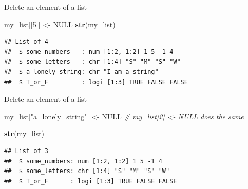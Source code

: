 \documentclass[ignorenonframetext,]{beamer}
\newenvironment{Shaded}{\begin{snugshade}}{\end{snugshade}}
\newcommand{\CommentTok}[1]{\textcolor[rgb]{0.56,0.35,0.01}{\textit{#1}}}
\newcommand{\DecValTok}[1]{\textcolor[rgb]{0.00,0.00,0.81}{#1}}
\newcommand{\KeywordTok}[1]{\textcolor[rgb]{0.13,0.29,0.53}{\textbf{#1}}}
\newcommand{\NormalTok}[1]{#1}
\newcommand{\OtherTok}[1]{\textcolor[rgb]{0.56,0.35,0.01}{#1}}
\newcommand{\StringTok}[1]{\textcolor[rgb]{0.31,0.60,0.02}{#1}}
\begin{document}
\begin{frame}[fragile]{Delete an element of a list}
\protect\hypertarget{delete-an-element-of-a-list-1}{}

\begin{Shaded}
\begin{Highlighting}[]
\NormalTok{my_list[[}\DecValTok{5}\NormalTok{]] <-}\StringTok{ }\OtherTok{NULL}
\KeywordTok{str}\NormalTok{(my_list)}
\end{Highlighting}
\end{Shaded}

\begin{verbatim}
## List of 4
##  $ some_numbers   : num [1:2, 1:2] 1 5 -1 4
##  $ some_letters   : chr [1:4] "S" "M" "S" "W"
##  $ a_lonely_string: chr "I-am-a-string"
##  $ T_or_F         : logi [1:3] TRUE FALSE FALSE
\end{verbatim}

\end{frame}

\begin{frame}[fragile]{Delete an element of a list}
\protect\hypertarget{delete-an-element-of-a-list-2}{}

\begin{Shaded}
\begin{Highlighting}[]
\NormalTok{my_list[}\StringTok{"a_lonely_string"}\NormalTok{] <-}\StringTok{ }\OtherTok{NULL}
\CommentTok{# my_list[2] <- NULL does the same}

\KeywordTok{str}\NormalTok{(my_list)}
\end{Highlighting}
\end{Shaded}

\begin{verbatim}
## List of 3
##  $ some_numbers: num [1:2, 1:2] 1 5 -1 4
##  $ some_letters: chr [1:4] "S" "M" "S" "W"
##  $ T_or_F      : logi [1:3] TRUE FALSE FALSE
\end{verbatim}

\end{frame}
\end{document}

